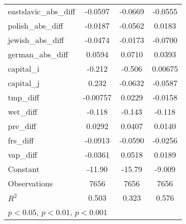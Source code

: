 {\begin{longtable}{l*{3}{c}}
eastslavic\_abs\_diff &     -0.0597\sym{***}&     -0.0669\sym{**} &     -0.0555\sym{**} \\
polish\_abs\_diff     &     -0.0187         &     -0.0562         &      0.0183         \\
jewish\_abs\_diff     &     -0.0474         &     -0.0173         &     -0.0700\sym{**} \\
german\_abs\_diff     &      0.0594\sym{**} &      0.0710\sym{**} &      0.0393\sym{*}  \\
capital\_i           &      -0.212         &      -0.506\sym{*}  &     0.00675         \\
capital\_j           &       0.232         &     -0.0632         &     -0.0587         \\
tmp\_diff            &    -0.00757         &      0.0229         &     -0.0158         \\
wet\_diff            &      -0.118\sym{***}&      -0.143\sym{***}&      -0.118\sym{***}\\
pre\_diff            &      0.0292\sym{***}&      0.0407\sym{***}&      0.0140\sym{**} \\
frs\_diff            &     -0.0913         &     -0.0590         &     -0.0256         \\
vap\_diff            &     -0.0361         &      0.0518         &      0.0189         \\
Constant            &      -11.90\sym{***}&      -15.79\sym{***}&      -9.009\sym{***}\\
\hline
Observations        &        7656         &        7656         &        7656         \\
\(R^{2}\)           &       0.503         &       0.323         &       0.576         \\
\hline\hline
\multicolumn{4}{l}{\footnotesize \sym{*} \(p<0.05\), \sym{**} \(p<0.01\), \sym{***} \(p<0.001\)}\\
\end{longtable}
}
